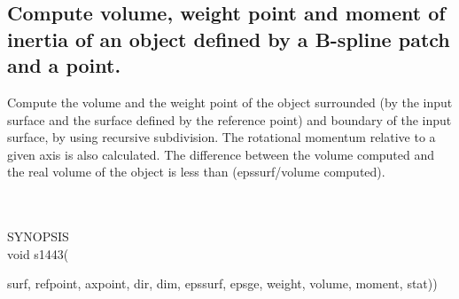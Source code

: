 \subsection{Compute volume, weight point and moment of inertia of an object defined by a B-spline 
patch and a point.}
\begin{minipg1}
Compute the volume and the weight point of the object surrounded (by the 
input 
surface and the surface defined by the reference point) and boundary of the input surface, by using recursive subdivision. The 
rotational momentum relative to a given axis is also calculated. The 
difference between the volume computed and the real volume of the object 
is 
less than (epssurf/volume computed).
\end{minipg1} \\ \\
SYNOPSIS\\
	\>void s1443(\begin{minipg3}
			{\fov surf}, {\fov refpoint}, {\fov axpoint}, {\fov dir}, {\fov dim}, {\fov epssurf}, {\fov epsge}, {\fov weight}, 	
			{\fov volume}, {\fov moment}, {\fov stat}))
		\end{minipg3}\\[0.3ex]

